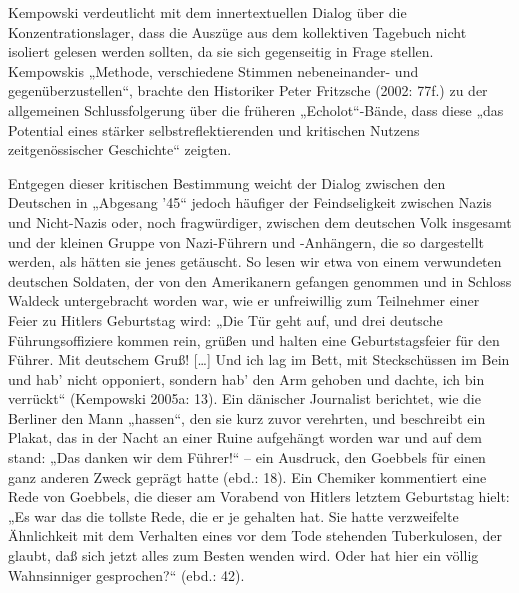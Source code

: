 \begin{multicols*}{2}
Kempowski verdeutlicht mit dem innertextuellen Dialog über die Konzentrationslager, dass die Auszüge aus dem kollektiven Tagebuch nicht isoliert gelesen werden sollten, da sie sich gegenseitig in Frage stellen. Kempowskis „Methode, verschiedene Stimmen nebeneinander- und gegenüberzustellen“, brachte den Historiker Peter Fritzsche (2002: 77f.) zu der allgemeinen Schlussfolgerung über die früheren „Echolot“-Bände, dass diese „das Potential eines stärker selbstreflektierenden und kritischen Nutzens zeitgenössischer Geschichte“ zeigten.

Entgegen dieser kritischen Bestimmung weicht der Dialog zwischen den Deutschen in „Abgesang ’45“ jedoch häufiger der Feindseligkeit zwischen Nazis und Nicht-Nazis oder, noch fragwürdiger, zwischen dem deutschen Volk insgesamt und der kleinen Gruppe von Nazi-Führern und -Anhängern, die so dargestellt werden, als hätten sie jenes getäuscht. So lesen wir etwa von einem verwundeten deutschen Soldaten, der von den Amerikanern gefangen genommen und in Schloss Waldeck untergebracht worden war, wie er unfreiwillig zum Teilnehmer einer Feier zu Hitlers Geburtstag wird: „Die Tür geht auf, und drei deutsche Führungsoffiziere kommen rein, grüßen und halten eine Geburtstagsfeier für den Führer. Mit deutschem Gruß! […] Und ich lag im Bett, mit Steckschüssen im Bein und hab’ nicht opponiert, sondern hab’ den Arm gehoben und dachte, ich bin verrückt“ (Kempowski 2005a: 13). Ein dänischer Journalist berichtet, wie die Berliner den Mann „hassen“, den sie kurz zuvor verehrten, und beschreibt ein Plakat, das in der Nacht an einer Ruine aufgehängt worden war und auf dem stand: „Das danken wir dem Führer!“ – ein Ausdruck, den Goebbels für einen ganz anderen Zweck geprägt hatte (ebd.: 18). Ein Chemiker kommentiert eine Rede von Goebbels, die dieser am Vorabend von Hitlers letztem Geburtstag hielt: „Es war das die tollste Rede, die er je gehalten hat. Sie hatte verzweifelte Ähnlichkeit mit dem Verhalten eines vor dem Tode stehenden Tuberkulosen, der glaubt, daß sich jetzt alles zum Besten wenden wird. Oder hat hier ein völlig Wahnsinniger gesprochen?“ (ebd.: 42).


\end{multicols*}
